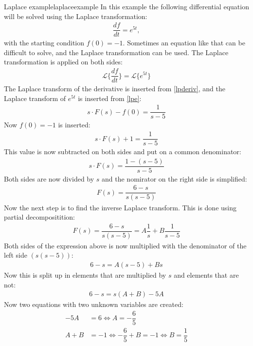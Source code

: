 \begin{example}{Laplace example}{laplaceexample}
In this example the following differential equation will be solved using the Laplace transformation:
\begin{align}
\dfrac{df}{dt}=e^{5t}, 	
\end{align} \label{inieq}
with the starting condition $f(0)=-1$. Sometimes an equation like that can be difficult to solve, and the Laplace transformation can be used. The Laplace transformation is applied on both sides:
\begin{align*}
\mathcal{L} \{\dfrac{df}{dt} \}= \mathcal{L} \{e^{5t} \}
\end{align*}
The Laplace transform of the derivative is inserted from \ref{lpderiv}, and the Laplace transform of $e^{5t}$ is inserted from \ref{lpe}:
\begin{align*}
s \cdot F(s) - f(0) = \dfrac{1}{s-5}
\end{align*}
Now $f(0)=-1$ is inserted:
\begin{align*}
s \cdot F(s) + 1 = \dfrac{1}{s-5}
\end{align*}
This value is now subtracted on both sides and put on a common denominator:
\begin{align*}
s \cdot F(s) = \dfrac{1-(s-5)}{s-5}
\end{align*}
Both sides are now divided by $s$ and the nomirator on the right side is simplified:
\begin{align*}
F(s) = \dfrac{6-s}{s(s-5)}
\end{align*}
Now the next step is to find the inverse Laplace transform. This is done using partial decompositition: \cite[p. 537]{calc}
\begin{align}
F(s) = \dfrac{6-s}{s(s-5)} = A \dfrac{1}{s} + B \dfrac{1}{s-5}
\label{par_dec}
\end{align}
Both sides of the expression above is now multiplied with the denominator of the left side $(s(s-5))$:
\begin{align*}
6 - s = A(s-5) + Bs
\end{align*}
Now this is split up in elements that are multiplied by $s$ and elements that are not:
\begin{align*}
6 - s = s(A+B) - 5A
\end{align*}
Now two equations with two unknown variables are created:
\begin{align*}
-5A &= 6 \Leftrightarrow A = - \dfrac{6}{5}\\
A + B &= -1 \Leftrightarrow - \dfrac{6}{5} + B = -1 \Leftrightarrow B = \dfrac{1}{5}

\end{align*}
\end{example}
